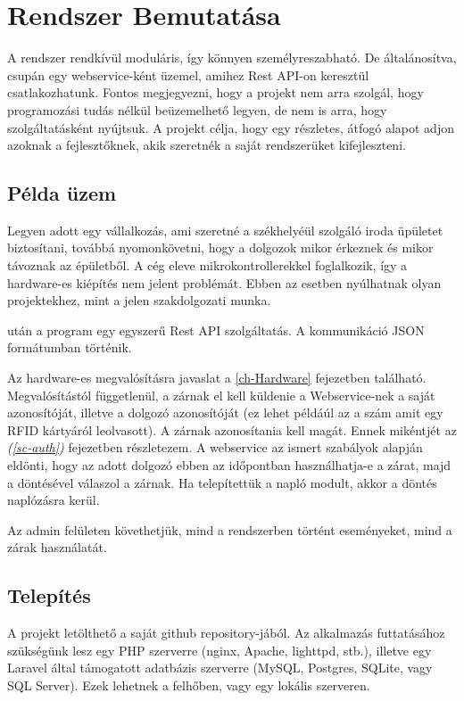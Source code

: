\documentclass[a4paper,12pt]{thesis-ekf}
\theoremstyle{definition}
\begin{document}
	\chapter{Rendszer Bemutatása}\label{ch-SystemIntro}
		A rendszer rendkívül moduláris, így könnyen személyreszabható. De általánosítva, csupán egy webservice-ként üzemel, amihez Rest API-on keresztül csatlakozhatunk. Fontos megjegyezni, hogy a projekt nem arra szolgál, hogy programozási tudás nélkül beüzemelhető legyen, de nem is arra, hogy szolgáltatásként nyújtsuk. A projekt célja, hogy egy részletes, átfogó alapot adjon azoknak a fejlesztőknek, akik szeretnék a saját rendszerüket kifejleszteni.
		
		\section{Példa üzem}
		Legyen adott egy vállalkozás, ami szeretné a székhelyéül szolgáló iroda üpületet biztosítani, továbbá nyomonkövetni, hogy a dolgozok mikor érkeznek és mikor távoznak az épületből. A cég eleve mikrokontrollerekkel foglalkozik, így a hardware-es kiépítés nem jelent problémát. Ebben az esetben nyúlhatnak olyan projektekhez, mint a jelen szakdolgozati munka.
		
		\emph{} után a program egy egyszerű Rest API szolgáltatás. A kommunikáció JSON formátumban történik. 
		
		Az hardware-es megvalósításra javaslat a \ref{ch-Hardware} fejezetben található. Megvalósítástól függetlenül, a zárnak el kell küldenie a Webservice-nek a saját azonosítóját, illetve a dolgozó azonosítóját (ez lehet példáúl az a szám amit egy RFID kártyáról leolvasott). A zárnak azonosítania kell magát. Ennek mikéntjét az \emph{ (\ref{sc-auth})} fejezetben részlet\-ezem. A webservice az ismert szabályok alapján eldönti, hogy az adott dolgozó ebben az időpontban használhatja-e a zárat, majd a döntésével válaszol a zárnak. Ha telepítettük a napló modult, akkor a döntés naplózásra kerül.
		
		Az admin felületen követhetjük, mind a rendszerben történt eseményeket, mind a zárak használatát.
		
		\section{Telepítés}\label{sc-Installation}
		 A projekt letölthető a saját github repository-jából. Az alkalmazás futtatásához szükségünk lesz egy PHP szerverre (nginx, Apache, lighttpd, stb.), illetve egy Laravel által támogatott adatbázis szerverre (MySQL, Postgres, SQLite, vagy SQL Server). Ezek lehetnek a felhőben, vagy egy lokális szerveren. 
		 
\end{document}
